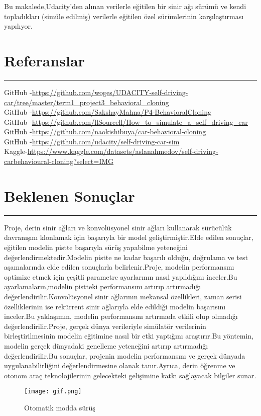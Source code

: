 \documentclass{article}
\begin{document}
\noindent Bu makalede\cite{smolyakov2018self},Udacity'den alınan verilerle eğitilen bir sinir ağı sürümü ve kendi topladıkları (simüle edilmiş) verilerle eğitilen özel sürümlerinin karşılaştırması yapılıyor.\\[15pt]

\section{Referanslar}
\rule{\textwidth}{0.5pt}
GitHub -\url{https://github.com/woges/UDACITY-self-driving-car/tree/master/term1_project3_behavioral_cloning}\\[5pt]
GitHub -\url{https://github.com/SakshayMahna/P4-BehavioralCloning}\\[5pt]
GitHub -\url{https://github.com/llSourcell/How_to_simulate_a_self_driving_car}\\[5pt]
GitHub -\url{https://github.com/naokishibuya/car-behavioral-cloning}\\[5pt]
GitHub -\url{https://github.com/udacity/self-driving-car-sim}\\[5pt]
Kaggle-\url{https://www.kaggle.com/datasets/aslanahmedov/self-driving-carbehavioural-cloning?select=IMG}\\[5pt]
\newpage

\section{Beklenen Sonuçlar}
\rule{\textwidth}{0.5pt}
Proje, derin sinir ağları ve konvolüsyonel sinir ağları kullanarak sürücülük davranışını klonlamak için başarıyla bir model geliştirmiştir.Elde edilen sonuçlar, eğitilen modelin pistte başarıyla sürüş yapabilme yeteneğini değerlendirmektedir.Modelin pistte ne kadar başarılı olduğu, doğrulama ve test aşamalarında elde edilen sonuçlarla belirlenir.Proje, modelin performansını optimize etmek için çeşitli parametre ayarlarının nasıl yapıldığını inceler.Bu ayarlamaların,modelin pistteki performansını artırıp artırmadığı değerlendirilir.Konvolüsyonel sinir ağlarının mekansal özellikleri, zaman serisi özelliklerinin ise rekürrent sinir ağlarıyla elde edildiği modelin başarısını inceler.Bu yaklaşımın, modelin performansını artırmada etkili olup olmadığı değerlendirilir.Proje, gerçek dünya verileriyle simülatör verilerinin birleştirilmesinin modelin eğitimine nasıl bir etki yaptığını araştırır.Bu yöntemin, modelin gerçek dünyadaki genelleme yeteneğini artırıp artırmadığı değerlendirilir.Bu sonuçlar, projenin modelin performansını ve gerçek dünyada uygulanabilirliğini değerlendirmesine olanak tanır.Ayrıca, derin öğrenme ve otonom araç teknolojilerinin gelecekteki gelişimine katkı sağlayacak bilgiler sunar.\\[15]

\begin{figure}[h]
  \centering
  \texttt{[image: gif.png]} %
  \caption{Otomatik modda sürüş}
  \label{fig:resim_etiketi}
\end{figure}








	
\end{document}
